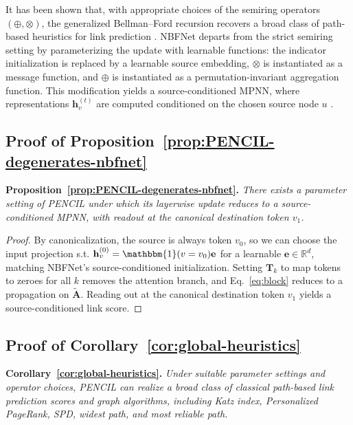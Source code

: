 \documentclass{article}
\theoremstyle{plain}
\theoremstyle{definition}
\theoremstyle{remark}
\begin{document}
It has been shown that, with appropriate choices of the semiring operators $(\oplus,\otimes)$, the generalized Bellman--Ford recursion recovers a broad class of path-based heuristics for link prediction \cite{zhu_neural_bellman-ford_2021}. 
NBFNet departs from the strict semiring setting by parameterizing the update with learnable functions: the indicator initialization is replaced by a learnable source embedding, $\otimes$ is instantiated as a message function, and $\oplus$ is instantiated as a permutation-invariant aggregation function. 
This modification yields a source-conditioned MPNN, where representations $\mathbf{h}_v^{(t)}$ are computed conditioned on the chosen source node $u$ \cite{you2021identity}. 

\subsection{Proof of Proposition~\ref{prop:PENCIL-degenerates-nbfnet}} \label{app:proof_PENCIL-degenerates-nbfnet}

\textbf{Proposition~\ref{prop:PENCIL-degenerates-nbfnet}.} \textit{There exists a parameter setting of PENCIL under which its layerwise update reduces to a source-conditioned MPNN, with readout at the canonical destination token \(v_1\).}
\begin{proof}
    By canonicalization, the source is always token $v_0$, so we can choose the input projection s.t.
    $\mathbf{h}_v^{(0)}=\mathbbm{1}(v=v_0)\mathbf{e}$ for a learnable $\mathbf{e}\in\mathbb{R}^d$, matching NBFNet's
    source-conditioned initialization. Setting $\mathbf{T}_k$ to map tokens to zeroes for all $k$ removes the attention branch, and
    Eq.~\ref{eq:block} reduces to a propagation on $\tilde{\mathbf{A}}$. Reading out at the canonical destination token $v_1$ yields a source-conditioned link score.
\end{proof}

\subsection{Proof of Corollary~\ref{cor:global-heuristics}} \label{app:proof_global-heuristics}

\textbf{Corollary~\ref{cor:global-heuristics}.} 
\textit{
    Under suitable parameter settings and operator choices, PENCIL can realize a broad class of classical path-based link prediction scores and graph algorithms, including Katz index, Personalized PageRank, SPD, widest path, and most reliable path.
}
\end{document}
